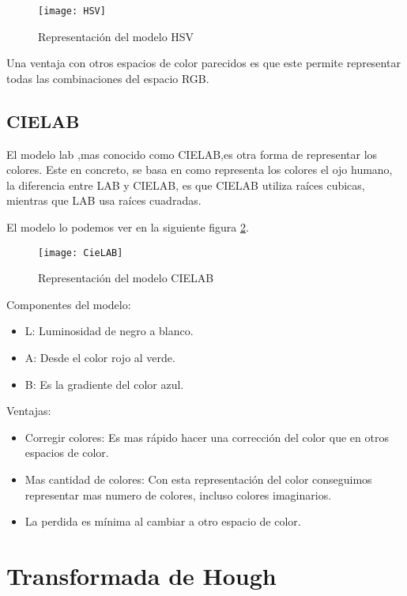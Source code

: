 \begin{figure}[h]
\centering
\texttt{[image: HSV]}
\caption{Representación del modelo HSV\cite{Manual:HAE}}
\label{fig:3.4}
\end{figure}

Una ventaja con otros espacios de color parecidos es que este permite representar todas las combinaciones del espacio RGB.

\subsection{CIELAB}
El modelo lab \cite{wiki:lab},mas conocido como CIELAB,es otra forma de representar los colores. Este en concreto, se basa en como representa los colores el ojo humano, la diferencia entre LAB y CIELAB, es que CIELAB utiliza raíces cubicas, mientras que LAB usa raíces cuadradas.

El modelo lo podemos ver en la siguiente figura  \ref{fig:3.8}.

\begin{figure}[h]
\centering
\texttt{[image: CieLAB]}
\caption{Representación del modelo CIELAB\cite{cie:LAB}}
\label{fig:3.8}
\end{figure}


Componentes del modelo:
\begin{itemize}
	\item L: Luminosidad de negro a blanco.
	\item A: Desde el color rojo al verde.
	\item B: Es la gradiente del color azul.
\end{itemize}

Ventajas:
\begin{itemize}
\item Corregir colores: Es mas rápido hacer una corrección del color que en otros espacios de color.
\item Mas cantidad de colores: Con esta representación del color conseguimos representar mas numero de colores, incluso colores imaginarios.
\item La perdida es mínima al cambiar a otro espacio de color.
\end{itemize}





\section{Transformada de Hough }

